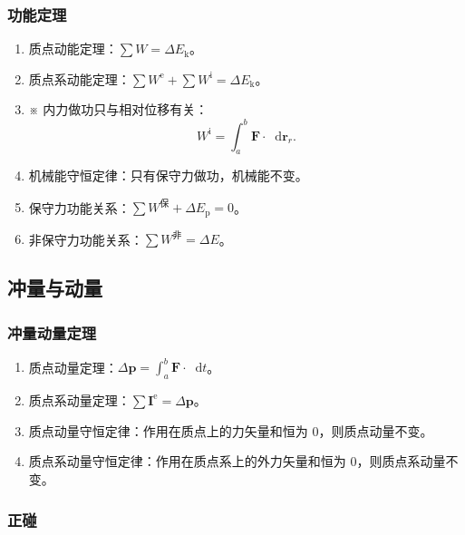 \documentclass[UTF8,fontset=fandol,zihao=5]{ctexart}
\newcommand{\vect}[1]{\bm{#1}}
\newcommand{\dif}{\mathop{}\!\mathrm{d}}
\begin{document}
\subsubsection{功能定理}

\begin{enumerate}
  \item 质点动能定理：\(\sum W=\Delta E_{\mathrm k}\)。
  \item 质点系动能定理：\(\sum W^{\mathrm e}+\sum W^{\mathrm i}=\Delta E_{\mathrm k}\)。
  \item[] ※ 内力做功只与相对位移有关：
  \[
    W^{\mathrm i}=\int_a^b\vect F\cdot\dif\vect r_r.
  \]
  \item 机械能守恒定律：只有保守力做功，机械能不变。
  \item 保守力功能关系：\(\sum W^{\text{保}}+\Delta E_{\mathrm p}=0\)。
  \item 非保守力功能关系：\(\sum W^{\text{非}}=\Delta E\)。
\end{enumerate}

\subsection{冲量与动量}

\subsubsection{冲量动量定理}

\begin{enumerate}
  \item 质点动量定理：\(\displaystyle\Delta\vect p=\int_a^b\vect F\cdot\dif t\)。
  \item 质点系动量定理：\(\sum\vect I^{\mathrm e}=\Delta\vect p\)。
  \item 质点动量守恒定律：作用在质点上的力矢量和恒为 0，则质点动量不变。
  \item 质点系动量守恒定律：作用在质点系上的外力矢量和恒为 0，则质点系动量不变。
\end{enumerate}

\subsubsection{正碰}
\end{document}
